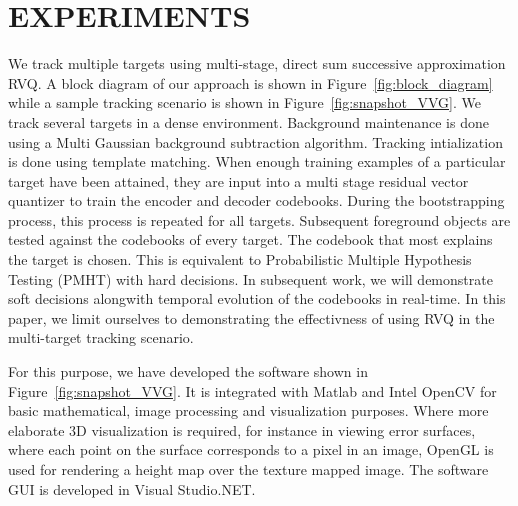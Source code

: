 \documentclass{article}
\begin{document}
\section{EXPERIMENTS}
We track multiple targets using multi-stage, direct sum successive approximation RVQ.  A block diagram of our approach is shown in Figure~\ref{fig:block_diagram} while a sample tracking scenario is shown in Figure~\ref{fig:snapshot_VVG}.  We track several targets in a dense environment.  Background maintenance is done using a Multi Gaussian background subtraction algorithm.  Tracking intialization is done using template matching.  When enough training examples of a particular target have been attained, they are input into a multi stage residual vector quantizer to train the encoder and decoder codebooks.  During the bootstrapping process, this process is repeated for all targets.  Subsequent foreground objects are tested against the codebooks of every target.  The codebook that most explains the target is chosen.  This is equivalent to Probabilistic Multiple Hypothesis Testing (PMHT) with hard decisions.  In subsequent work, we will demonstrate soft decisions alongwith temporal evolution of the codebooks in real-time.  In this paper, we limit ourselves to demonstrating the effectivness of using RVQ in the multi-target tracking scenario.

For this purpose, we have developed the software shown in Figure~\ref{fig:snapshot_VVG}.  It is integrated with Matlab and Intel OpenCV for basic mathematical, image processing and visualization purposes.  Where more elaborate 3D visualization is required, for instance in viewing error surfaces, where each point on the surface corresponds to a pixel in an image, OpenGL is used for rendering a height map over the texture mapped image. The software GUI is developed in Visual Studio.NET.

\end{document}
